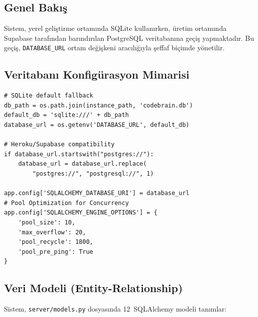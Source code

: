 \documentclass[12pt,a4paper]{article}
\begin{document}
\subsection{Genel Bakış}

Sistem, yerel geliştirme ortamında SQLite kullanırken, üretim ortamında Supabase tarafından barındırılan PostgreSQL veritabanına geçiş yapmaktadır. Bu geçiş, \texttt{DATABASE\_URL} ortam değişkeni aracılığıyla şeffaf biçimde yönetilir.

\subsection{Veritabanı Konfigürasyon Mimarisi}

\begin{lstlisting}[style=pythonstyle, caption={Veritabanı Konfigürasyonu (app.py, satır 53--74)}, label=lst:dbconfig]
# SQLite default fallback
db_path = os.path.join(instance_path, 'codebrain.db')
default_db = 'sqlite:///' + db_path
database_url = os.getenv('DATABASE_URL', default_db)

# Heroku/Supabase compatibility
if database_url.startswith("postgres://"):
    database_url = database_url.replace(
        "postgres://", "postgresql://", 1)

app.config['SQLALCHEMY_DATABASE_URI'] = database_url
# Pool Optimization for Concurrency
app.config['SQLALCHEMY_ENGINE_OPTIONS'] = {
    'pool_size': 10,
    'max_overflow': 20,
    'pool_recycle': 1800,
    'pool_pre_ping': True
}
\end{lstlisting}

\subsection{Veri Modeli (Entity-Relationship)}

Sistem, \texttt{server/models.py} dosyasında 12~SQLAlchemy modeli tanımlar:
\end{document}
